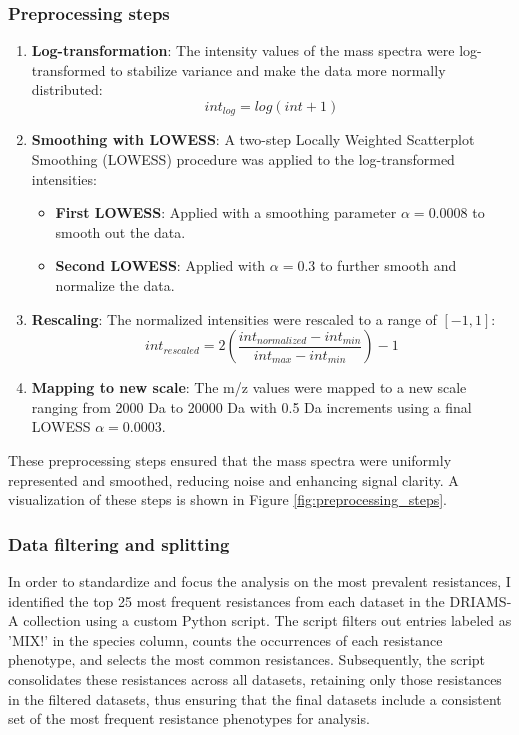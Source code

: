 \documentclass[english,11pt,a4paper,titlepage]{article}
\begin{document}
	\subsubsection*{Preprocessing steps}
	\begin{enumerate}
		\item \textbf{Log-transformation}: The intensity values of the mass spectra were log-transformed to stabilize variance and make the data more normally distributed:
		\begin{equation*}
			int_{log} = log(int + 1)
		\end{equation*}
		\item \textbf{Smoothing with LOWESS}: A two-step Locally Weighted Scatterplot Smoothing (LOWESS) procedure was applied to the log-transformed intensities:
		\begin{itemize}
			\item \textbf{First LOWESS}: Applied with a smoothing parameter \( \alpha = 0.0008 \) to smooth out the data.
			\item \textbf{Second LOWESS}: Applied with \( \alpha = 0.3 \) to further smooth and normalize the data.
		\end{itemize}
		\item \textbf{Rescaling}: The normalized intensities were rescaled to a range of \( [-1, 1] \):
		\begin{equation}
			int_{rescaled} = 2 \left( \frac{int_{normalized} - int_{min}}{int_{max} - int_{min}} \right) - 1
		\end{equation}
		\item \textbf{Mapping to new scale}: The m/z values were mapped to a new scale ranging from 2000 Da to 20000 Da with 0.5 Da increments using a final LOWESS \( \alpha = 0.0003 \).
	\end{enumerate}
	These preprocessing steps ensured that the mass spectra were uniformly represented and smoothed, reducing noise and enhancing signal clarity. A visualization of these steps is shown in Figure \ref{fig:preprocessing_steps}.
	
	\subsubsection*{Data filtering and splitting}
	In order to standardize and focus the analysis on the most prevalent resistances, I identified the top 25 most frequent resistances from each dataset in the DRIAMS-A collection using a custom Python script. The script filters out entries labeled as 'MIX!' in the species column, counts the occurrences of each resistance phenotype, and selects the most common resistances. Subsequently, the script consolidates these resistances across all datasets, retaining only those resistances in the filtered datasets, thus ensuring that the final datasets include a consistent set of the most frequent resistance phenotypes for analysis.
	
\end{document}
